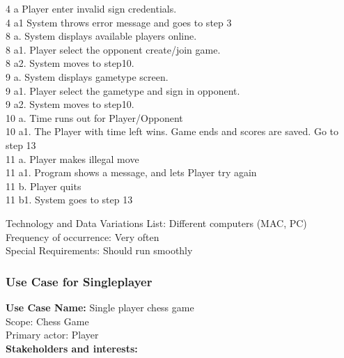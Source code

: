 \documentclass{article}
\begin{document}
\begin{flushleft}
\hspace{5mm} 4 a Player enter invalid sign credentials.\\
\hspace{5mm} 4 a1 System throws error message and goes to step 3\\
\hspace{5mm} 8 a. System displays available players online.\\
\hspace{5mm} 8 a1. Player select the opponent create/join game.\\
\hspace{5mm} 8 a2. System moves to step10.\\
\hspace{5mm} 9 a. System displays gametype screen.\\
\hspace{5mm} 9 a1. Player select the gametype and sign in opponent. \\
\hspace{5mm} 9 a2. System moves to step10.\\
\hspace{5mm} 10 a. Time runs out for Player/Opponent\\
\hspace{5mm} 10 a1. The Player with time left wins. Game ends and scores are saved. Go to step 13\\
\hspace{5mm} 11 a. Player makes illegal move\\
\hspace{5mm} 11 a1. Program shows a message, and lets Player try again\\
\hspace{5mm} 11 b. Player quits\\
\hspace{5mm} 11 b1. System goes to step 13\\
\vspace{3mm}

Technology and Data Variations List:\hspace{3mm} Different computers (MAC, PC)\\
Frequency of occurrence:\hspace{3mm} Very often\\
Special Requirements:\hspace{3mm} Should run smoothly\\



\subsubsection{Use Case for Singleplayer}
\textbf {Use Case Name:} Single player chess game\\
\vspace{1mm}
Scope: Chess Game\\
\vspace{1mm}
Primary actor: Player\\
\vspace{1mm}
\textbf{Stakeholders and interests:}\\


\end{flushleft}
\end{document}
